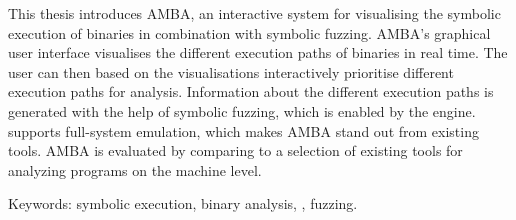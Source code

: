 This thesis introduces AMBA, an interactive system for visualising the symbolic execution of binaries in combination with symbolic fuzzing.
AMBA's graphical user interface visualises the different execution paths of binaries in real time.
The user can then based on the visualisations interactively prioritise different execution paths for analysis.
Information about the different execution paths is generated with the help of symbolic fuzzing, which is enabled by the \stoe{} engine.
\stoe{} supports full-system emulation, which makes AMBA stand out from existing tools.
AMBA is evaluated by comparing to a selection of existing tools for analyzing programs on the machine level.

Keywords: symbolic execution, binary analysis, \stoe{}, fuzzing.
